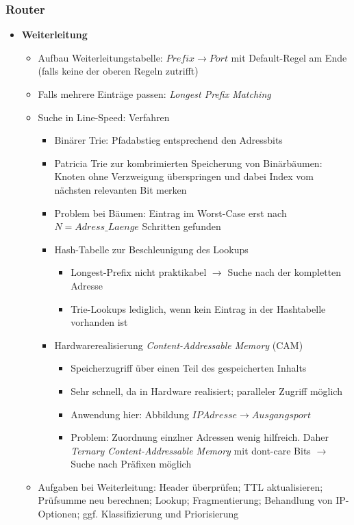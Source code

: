 \subsubsection{Router}
\begin{itemize}
	\item \textbf{Weiterleitung}
	\begin{itemize}
		\item Aufbau Weiterleitungstabelle: \(Prefix \rightarrow Port\) mit Default-Regel am Ende (falls keine der oberen Regeln zutrifft)
		\item Falls mehrere Einträge passen: \textit{Longest Prefix Matching}
		\item Suche in Line-Speed: Verfahren
		\begin{itemize}
			\item Binärer Trie: Pfadabstieg entsprechend den Adressbits
			\item Patricia Trie zur kombrimierten Speicherung von Binärbäumen: Knoten ohne Verzweigung überspringen und dabei Index vom nächsten relevanten Bit merken
			\item Problem bei Bäumen: Eintrag im Worst-Case erst nach \(N=Adress\_Laenge\) Schritten gefunden
			\item Hash-Tabelle zur Beschleunigung des Lookups
			\begin{itemize}
				\item Longest-Prefix nicht praktikabel \(\rightarrow\) Suche nach der kompletten Adresse
				\item Trie-Lookups lediglich, wenn kein Eintrag in der Hashtabelle vorhanden ist
			\end{itemize}
			\item Hardwarerealisierung \textit{Content-Addressable Memory} (CAM)
			\begin{itemize}
				\item Speicherzugriff über einen Teil des gespeicherten Inhalts
				\item Sehr schnell, da in Hardware realisiert; paralleler Zugriff möglich
				\item Anwendung hier: Abbildung \(IPAdresse \rightarrow Ausgangsport\)
				\item Problem: Zuordnung einzlner Adressen wenig hilfreich. Daher \textit{Ternary Content-Addressable Memory} mit dont-care Bits \(\rightarrow\) Suche nach Präfixen möglich
			\end{itemize}
		\end{itemize}
		\item Aufgaben bei Weiterleitung: Header überprüfen; TTL aktualisieren; Prüfsumme neu berechnen; Lookup; Fragmentierung; Behandlung von IP-Optionen; ggf. Klassifizierung und Priorisierung

\end{itemize}
\end{itemize}
